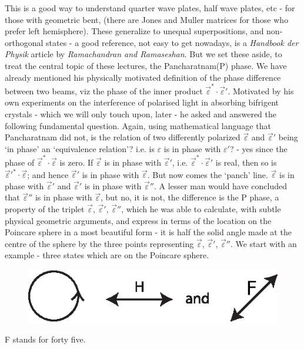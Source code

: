 This is a good way to understand quarter wave plates, half wave plates,
etc - for those with geometric bent, (there are Jones and Muller matrices for
those who prefer left hemisphere). These generalize to unequal superpositions,
and non-orthogonal states - a good reference, not easy to get nowadays, is a
\textit{Handbook der Physik} article by \textit{Ramachandran and Ramaseshan}. But we set
these aside, to treat the central topic of these lectures, the Pancharatnam(P)
phase. We have already mentioned his physically motivated definition of the
phase difference between two beams, viz the phase of the inner product $\overrightarrow{\varepsilon}^{\ast} \cdot \overrightarrow{\varepsilon}'$. 
Motivated by his own experiments on the interference of polarised light in absorbing bifrigent crystals - which we will only touch upon, later - he asked and
answered the following fundamental question. Again, using mathematical language that Pancharatnam did not, is the relation of two differently polarized
$\overrightarrow{\varepsilon}$ and $\overrightarrow{\varepsilon}'$ being `in phase' an `equivalence relation'? i.e. is $\varepsilon$ is in phase
with $\varepsilon'$? - yes since the phase of $\overrightarrow{\varepsilon}^{\ast} \cdot \overrightarrow{\varepsilon}$ is zero. If $\overrightarrow{\varepsilon}$ is in phase with $\overrightarrow{\varepsilon}'$, i.e. $\overrightarrow{\varepsilon}^{\ast} \cdot \overrightarrow{\varepsilon}'$ is real, then so is $\overrightarrow{\varepsilon}'^{\ast} \cdot \overrightarrow{\varepsilon}$; and hence $\overrightarrow{\varepsilon}'$ is in phase with $\overrightarrow{\varepsilon}$. But now 
comes the `panch' line. $\overrightarrow{\varepsilon}$ is in phase with $\overrightarrow{\varepsilon}'$ and $\overrightarrow{\varepsilon}'$ is in phase with $\overrightarrow{\varepsilon}''$. A lesser man would have concluded that $\overrightarrow{\varepsilon}''$ is in phase with $\overrightarrow{\varepsilon}$, but no, it is not,
the difference is the P phase, a property of the triplet $\overrightarrow{\varepsilon}$, $\overrightarrow{\varepsilon}'$, $\overrightarrow{\varepsilon}''$, which he 
was able to calculate, with subtle physical geometric arguments, and express in
terms of the location on the Poincare sphere in a most beautiful form - it is half
the solid angle made at the centre of the sphere by the three points representing
$\overrightarrow{\varepsilon}$, $\overrightarrow{\varepsilon}'$, $\overrightarrow{\varepsilon}''$. We start with an example - three states which are on the Poincare
sphere.
\begin{figure}[H]
\centering
\includegraphics[scale=0.7]{src/images/chap26/10.eps}
\end{figure}
F stands for forty five.

